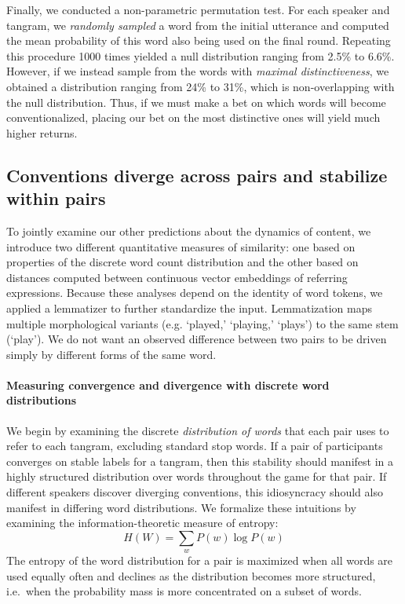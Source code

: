 \documentclass[alpha-refs]{wiley-article}
\begin{document}
Finally, we conducted a non-parametric permutation test.
For each speaker and tangram, we \emph{randomly sampled} a word from the initial utterance and computed the mean probability of this word also being used on the final round.
Repeating this procedure 1000 times yielded a null distribution ranging from 2.5\% to 6.6\%.
However, if we instead sample from the words with \emph{maximal distinctiveness}, we obtained a distribution ranging from 24\% to 31\%, which is non-overlapping with the null distribution.
Thus, if we must make a bet on which words will become conventionalized, placing our bet on the most distinctive ones will yield much higher returns.

\subsection{Conventions diverge across pairs and stabilize within pairs}

To jointly examine our other predictions about the dynamics of content, we introduce two different quantitative measures of similarity: one based on properties of the discrete word count distribution and the other based on distances computed between continuous vector embeddings of referring expressions. 
Because these analyses depend on the identity of word tokens, we applied a lemmatizer to further standardize the input.
Lemmatization maps multiple morphological variants (e.g. `played,' `playing,' `plays') to the same stem (`play').
We do not want an observed difference between two pairs to be driven simply by different forms of the same word.

\paragraph{Measuring convergence and divergence with discrete word distributions}

We begin by examining the discrete \emph{distribution of words} that each pair uses to refer to each tangram, excluding standard stop words.
If a pair of participants converges on stable labels for a tangram, then this stability should manifest in a highly structured distribution over words throughout the game for that pair.
If different speakers discover diverging conventions, this idiosyncracy should also manifest in differing word distributions.
We formalize these intuitions by examining the information-theoretic measure of entropy: $$H(W) = \sum_w P(w) \log P(w)$$
The entropy of the word distribution for a pair is maximized when all words are used equally often and declines as the distribution becomes more structured, i.e.~when the probability mass is more concentrated on a subset of words.
\end{document}
